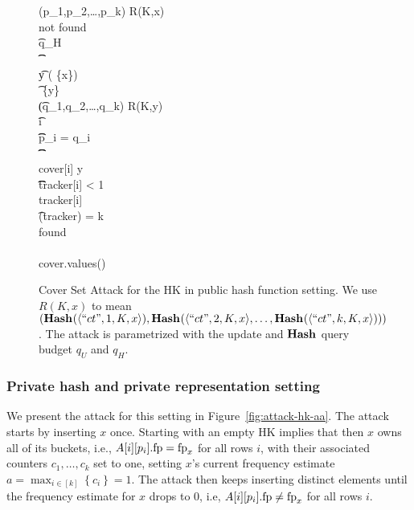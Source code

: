 \begin{figure*}[h]
\begin{pchstack}[boxed,center,space=0.5em]
\begin{pcvstack}[space=0.45em]
{			\\
			\\
			(p_1,p_2,\ldots,p_k) \gets R(K,x)\\
			\pcwhile \textrm{not found}\\
			\t \pcif q_H \ \HASHO{}\\
			\t \t \pcreturn \emptyset\\
			\t y \getsr {}\setminus ( \cup \{x\})\\
			\t \set{I} \gets {} \cup \{y\}\\
			\t (q_1,q_2,\ldots,q_k) \gets R(K,y)\\
			\t \pcfor i \in [k]\\
			\t \t \pcif p_i = q_i\\
			\t \t \t {}\\
			\t \t \t \textrm{cover}[i] \gets y\\
			\t \t \t \pcif \textrm{tracker}[i] < 1\\
			\t \t \t \t  \textrm{tracker}[i] \\
			\t \pcif {}(\textrm{tracker}) = k\\
			\t \t \textrm{found} \gets {}\\
			\\
			\pcreturn \textrm{cover.values()}
		}
	\end{pcvstack}
	\end{pchstack}
	\caption[Public Hash HK Attack.]{Cover Set Attack for the HK in public
		hash function setting. 
		We use $R(K,x)$ to mean $(\textup{\textbf{Hash}}\hspace{0.5pt}(\langle ``ct", 1,K,x \rangle),\textup{\textbf{Hash}}\hspace{0.5pt}(\langle ``ct", 2,K,x \rangle,\ldots,\textup{\textbf{Hash}}\hspace{0.5pt}(\langle ``ct", k,K,x \rangle)))$.
		The attack is parametrized with the update and $\textup{\textbf{Hash}}\hspace{0.5pt}$ query budget $q_U$ and $q_H$.
	}
	\label{fig:attack-hk-hfis}
\end{figure*}

\subsubsection{Private hash and private representation setting}
We present the attack for this setting in Figure~\ref{fig:attack-hk-aa}.
The attack starts by inserting $x$ once. Starting with an empty HK implies that then $x$ owns all of its buckets, i.e., $A[i][p_i].\textup{fp} = \textup{fp}_x$ for all rows $i$, with their associated counters $c_1, \dots, c_k$ set to one, setting $x$'s current frequency estimate 
$a = \max_{{i \in [k]}} \left\{c_i\right\} = 1$. The attack then keeps inserting distinct elements until the frequency estimate for $x$ drops to $0$, i.e, $A[i][p_i].\textup{fp} \not= \textup{fp}_x$ for all rows $i$.

